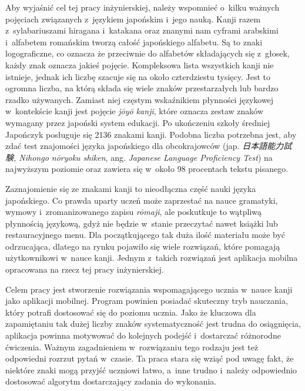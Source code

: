 \documentclass[a4paper,twoside,12pt]{book}
\newcommand{\obcy}[1]{\emph{#1}}
\newcommand{\english}[1]{{\selectlanguage{british}\obcy{#1}}}
\newcommand{\japanese}[1]{{\selectlanguage{japanese}\obcy{#1}}}
\begin{document}
Aby wyjaśnić cel tej pracy inżynierskiej, należy wspomnieć o~kilku ważnych pojęciach związanych z~językiem japońskim i~jego nauką. Kanji razem z~sylabariuszami hiragana i~katakana oraz znanymi nam cyframi arabskimi i~alfabetem romańskim tworzą całość japońskiego alfabetu. Są to znaki logograficzne, co oznacza że przeciwnie do alfabetów składających się z~głosek, każdy znak oznacza jakieś pojęcie. Kompleksowa lista wszystkich kanji nie istnieje, jednak ich liczbę szacuje się na około czterdziestu tysięcy. Jest to ogromna liczba, na którą składa się wiele znaków przestarzałych lub bardzo rzadko używanych. Zamiast niej częstym wskaźnikiem płynności językowej w~kontekście kanji jest pojęcie \textit{jōyō kanji}, które oznacza zestaw znaków wymagany przez japoński system edukacji. Po ukończeniu szkoły średniej Japończyk posługuje się 2136 znakami kanji. Podobna liczba potrzebna jest, aby zdać test znajomości języka japońskiego dla obcokrajowców (jap. \japanese{日本語能力試験, Nihongo nōryoku shiken}, ang. \english{Japanese Language Proficiency Test}) na najwyższym poziomie oraz zawiera się w~około 98 procentach tekstu pisanego.

Zaznajomienie się ze znakami kanji to nieodłączna część nauki języka japońskiego. Co prawda uparty uczeń może zaprzestać na nauce gramatyki, wymowy i~zromanizowanego zapisu \textit{rōmaji}, ale poskutkuje to wątpliwą płynnością językową, gdyż nie będzie w~stanie przeczytać nawet książki lub restauracyjnego menu. Dla początkującego tak duża ilość materiału może być odrzucająca, dlatego na rynku pojawiło się wiele rozwiązań, które pomagają użytkownikowi w~nauce kanji. Jednym z~takich rozwiązań jest aplikacja mobilna opracowana na rzecz tej pracy inżynierskiej.

Celem pracy jest stworzenie rozwiązania wspomagającego ucznia w~nauce kanji jako aplikacji mobilnej. Program powinien posiadać skuteczny tryb nauczania, który potrafi dostosować się do poziomu ucznia. Jako że kluczowa dla zapamiętaniu tak dużej liczby znaków systematyczność jest trudna do osiągnięcia, aplikacja powinna motywować do kolejnych podejść i~dostarczać różnorodne ćwiczenia. Ważnym zagadnieniem w~rozwiązaniu tego rodzaju jest też odpowiedni rozrzut pytań w~czasie. Ta praca stara się wziąć pod uwagę fakt, że niektóre znaki mogą przyjść uczniowi łatwo, a~inne trudno i~należy odpowiednio dostosować algorytm dostarczający zadania do wykonania.
\end{document}
